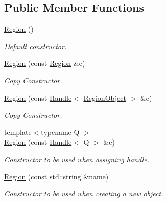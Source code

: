 \subsection*{Public Member Functions}
\begin{DoxyCompactItemize}
\item 
\hyperlink{class_d_d4hep_1_1_geometry_1_1_region_ac8a2149581dcb28deb871bc812749cd7}{Region} ()
\begin{DoxyCompactList}\small\item\em Default constructor. \item\end{DoxyCompactList}\item 
\hyperlink{class_d_d4hep_1_1_geometry_1_1_region_a81c2f0b5d7cd042c22af48acd27bf95c}{Region} (const \hyperlink{class_d_d4hep_1_1_geometry_1_1_region}{Region} \&e)
\begin{DoxyCompactList}\small\item\em Copy Constructor. \item\end{DoxyCompactList}\item 
\hyperlink{class_d_d4hep_1_1_geometry_1_1_region_a965bf209a05655ee147c4adcdddfe20f}{Region} (const \hyperlink{class_d_d4hep_1_1_handle}{Handle}$<$ \hyperlink{class_d_d4hep_1_1_geometry_1_1_region_object}{RegionObject} $>$ \&e)
\begin{DoxyCompactList}\small\item\em Copy Constructor. \item\end{DoxyCompactList}\item 
{\footnotesize template$<$typename Q $>$ }\\\hyperlink{class_d_d4hep_1_1_geometry_1_1_region_a7199d3d0e37bde7202cc311958028d1b}{Region} (const \hyperlink{class_d_d4hep_1_1_handle}{Handle}$<$ Q $>$ \&e)
\begin{DoxyCompactList}\small\item\em Constructor to be used when assigning handle. \item\end{DoxyCompactList}\item 
\hyperlink{class_d_d4hep_1_1_geometry_1_1_region_a4856d1d3d4f373d310f3f275c99fe11d}{Region} (const std::string \&name)
\begin{DoxyCompactList}\small\item\em Constructor to be used when creating a new object. \item\end{DoxyCompactList}\item 

\end{DoxyCompactItemize}
